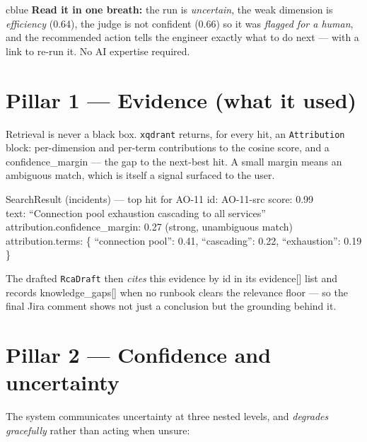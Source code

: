 \documentclass[11pt]{article}
\newcommand{\fld}[1]{{\ttfamily\color{emdark}#1}}
\begin{document}
\begin{notebox}{cblue}
\textbf{Read it in one breath:} the run is \emph{uncertain}, the weak dimension is
\emph{efficiency} (0.64), the judge is not confident (0.66) so it was \emph{flagged for a
human}, and the recommended action tells the engineer exactly what to do next --- with a link to
re-run it. No AI expertise required.
\end{notebox}

\section{Pillar 1 --- Evidence (what it used)}
Retrieval is never a black box. \texttt{xqdrant} returns, for every hit, an
\texttt{Attribution} block: per-dimension and per-term contributions to the cosine score, and a
\fld{confidence\_margin} --- the gap to the next-best hit. A small margin means an ambiguous
match, which is itself a signal surfaced to the user.

\begin{artifact}{SearchResult (incidents) --- top hit for AO-11}
\fld{id}: AO-11-src \hfill \fld{score}: 0.99\\[2pt]
\fld{text}: ``Connection pool exhaustion cascading to all services''\\[2pt]
\fld{attribution.confidence\_margin}: 0.27 \;\;(strong, unambiguous match)\\[2pt]
\fld{attribution.terms}: \{ ``connection pool'': 0.41, ``cascading'': 0.22, ``exhaustion'': 0.19 \}
\end{artifact}

The drafted \texttt{RcaDraft} then \emph{cites} this evidence by id in its \fld{evidence[]}
list and records \fld{knowledge\_gaps[]} when no runbook clears the relevance floor --- so the
final Jira comment shows not just a conclusion but the grounding behind it.

\section{Pillar 2 --- Confidence and uncertainty}
The system communicates uncertainty at three nested levels, and \emph{degrades gracefully}
rather than acting when unsure:
\end{document}
